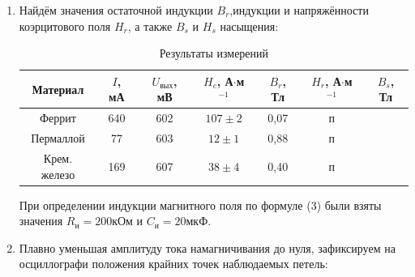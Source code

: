 \documentclass[a4paper,12pt]{article} %
\begin{document}
\begin{enumerate}
\item Найдём значения остаточной индукции $B_{r}$,индукции  и напряжённости коэрцитового поля $H_{r}$, а также $B_{s}$ и $H_{s}$ насыщения:

  \begin{table}[H]
    \centering
    \begin{tabular}{|c|c|c|c|c|c|c|}
      \hline
      Материал     & $I$, мА & $U_{вых}$, мВ & $H_{c}$, А$\cdot$м$^{-1}$ & $B_{r}$, Тл & $H_{r}$, А$\cdot$м$^{-1}$ &  $B_{s}$, Тл \\ \hline
      Феррит       & 640   &   602         & $107\pm2$ & 0,07   & п &   \\ \hline
      Пермаллой    & 77    &   603          & $12\pm1$ & 0,88   &  п &  \\ \hline
      Крем. железо & 169   &   607         & $38\pm4$   & 0,40   &  п &  \\ \hline
    \end{tabular}
    \caption{Результаты измерений}
    \label{tab:izm}
  \end{table}

  При определении индукции магнитного поля по формуле (3) были взяты значения $R_{и} = 200 \text{кОм}$ и $C_{и} = 20 \text{мкФ}$.

\item Плавно уменьшая амплитуду тока намагничивания до нуля, зафиксируем на осциллографи положения крайних точек наблюдаемых петель:



\end{enumerate}
\end{document}
